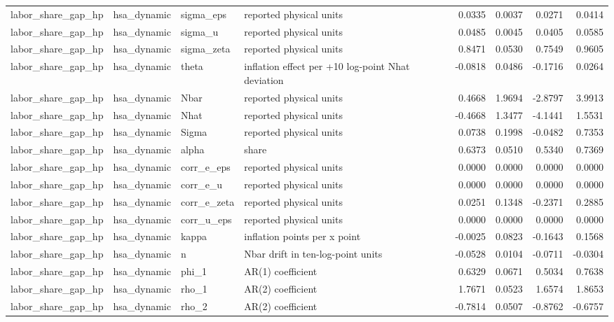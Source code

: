 \begin{tabular}{llllrrrr}
labor\_share\_gap\_hp & hsa\_dynamic & sigma\_eps & reported physical units & 0.0335 & 0.0037 & 0.0271 & 0.0414 \\
labor\_share\_gap\_hp & hsa\_dynamic & sigma\_u & reported physical units & 0.0485 & 0.0045 & 0.0405 & 0.0585 \\
labor\_share\_gap\_hp & hsa\_dynamic & sigma\_zeta & reported physical units & 0.8471 & 0.0530 & 0.7549 & 0.9605 \\
labor\_share\_gap\_hp & hsa\_dynamic & theta & inflation effect per +10 log-point Nhat deviation & -0.0818 & 0.0486 & -0.1716 & 0.0264 \\
labor\_share\_gap\_hp & hsa\_dynamic & Nbar & reported physical units & 0.4668 & 1.9694 & -2.8797 & 3.9913 \\
labor\_share\_gap\_hp & hsa\_dynamic & Nhat & reported physical units & -0.4668 & 1.3477 & -4.1441 & 1.5531 \\
labor\_share\_gap\_hp & hsa\_dynamic & Sigma & reported physical units & 0.0738 & 0.1998 & -0.0482 & 0.7353 \\
labor\_share\_gap\_hp & hsa\_dynamic & alpha & share & 0.6373 & 0.0510 & 0.5340 & 0.7369 \\
labor\_share\_gap\_hp & hsa\_dynamic & corr\_e\_eps & reported physical units & 0.0000 & 0.0000 & 0.0000 & 0.0000 \\
labor\_share\_gap\_hp & hsa\_dynamic & corr\_e\_u & reported physical units & 0.0000 & 0.0000 & 0.0000 & 0.0000 \\
labor\_share\_gap\_hp & hsa\_dynamic & corr\_e\_zeta & reported physical units & 0.0251 & 0.1348 & -0.2371 & 0.2885 \\
labor\_share\_gap\_hp & hsa\_dynamic & corr\_u\_eps & reported physical units & 0.0000 & 0.0000 & 0.0000 & 0.0000 \\
labor\_share\_gap\_hp & hsa\_dynamic & kappa & inflation points per x point & -0.0025 & 0.0823 & -0.1643 & 0.1568 \\
labor\_share\_gap\_hp & hsa\_dynamic & n & Nbar drift in ten-log-point units & -0.0528 & 0.0104 & -0.0711 & -0.0304 \\
labor\_share\_gap\_hp & hsa\_dynamic & phi\_1 & AR(1) coefficient & 0.6329 & 0.0671 & 0.5034 & 0.7638 \\
labor\_share\_gap\_hp & hsa\_dynamic & rho\_1 & AR(2) coefficient & 1.7671 & 0.0523 & 1.6574 & 1.8653 \\
labor\_share\_gap\_hp & hsa\_dynamic & rho\_2 & AR(2) coefficient & -0.7814 & 0.0507 & -0.8762 & -0.6757 \\

\end{tabular}
